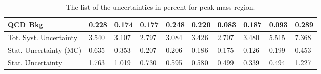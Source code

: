 \begin{table}
\begin{tabular}{l r p{0.7cm}p{0.7cm}p{0.7cm}p{0.7cm}p{0.7cm}p{0.7cm}p{0.7cm}p{0.7cm}l}
\multicolumn{2}{l}{QCD Bkg}                       & 0.228 & 0.174 & 0.177 & 0.248 & 0.220 & 0.083 & 0.187 & 0.093 & 0.289 \\
\hline
\multicolumn{2}{l}{Tot. Syst. Uncertainty}        & 3.540 & 3.107 & 2.797 & 3.084 & 3.426 & 2.707 & 3.480 & 5.515 & 7.368 \\
\hline
\multicolumn{2}{l}{Stat. Uncertainty (MC)}        & 0.635 & 0.353 & 0.207 & 0.206 & 0.186 & 0.175 & 0.126 & 0.199 & 0.453 \\
\multicolumn{2}{l}{Stat. Uncertainty}             & 1.763 & 1.019 & 0.730 & 0.595 & 0.580 & 0.499 & 0.339 & 0.494 & 1.227 \\
\hline \hline
\end{tabular}
\caption{The list of the uncertainties in percent for peak mass region.}
\label{tab:Zee_unc_list_peak}
\end{table}

